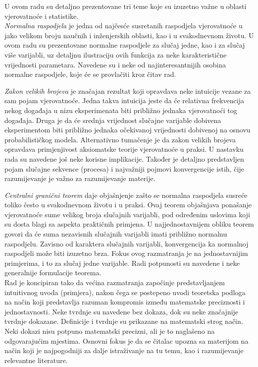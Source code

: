 
\indent
U ovom radu su detaljno prezentovane tri teme koje su izuzetno važne u oblasti
vjerovatnoće i statistike.  \\

\textit{Normalna raspodjela} je jedna od najčesće susretanih raspodjela vjerovatnoće u
jako velikom broju naučnih i inženjerskih oblasti, kao i u svakodnevnom životu.
U ovom radu su prezentovane normalne raspodjele za slučaj jedne, kao i za slučaj
više varijabli, uz detaljnu ilustraciju ovih funkcija za neke karakteristične
vrijednosti parametara. Navedene su i neke od najinteresantnijih osobina
normalne raspodjele, koje će se provlačiti kroz čitav rad.

\textit{Zakon velikih brojeva} je značajan rezultat koji opravdava neke
intuicije vezane za sam pojam vjerovatnoće. Jedna takva intuicija jeste da će
relativna frekvencija nekog događaja u nizu eksperimenata biti približno jednaka
vjerovatnoći tog događaja. Druga je da će srednja vrijednost slučajne varijable
dobivena eksperimentom biti približno jednaka očekivanoj vrijednosti dobivenoj
na osnovu probabilističkog modela. Alternativno tumačenje je da zakon velikih
brojeva opravdava primjenjivost aksiomatske teorije vjerovatnoće u praksi. U
nastavku rada su navedene još neke korisne implikacije. Također je detaljno
predstavljen pojam slučajne sekvence (procesa) i najvažniji pojmovi
konvergencije istih, čije razumijevanje je važno za razumijevanje materije. 

\textit{Centralni granični teorem} daje objašnjenje zašto se normalna raspodjela
susreće toliko često u svakodnevnom životu i u praksi. Ovaj teorem objašnjava
ponašanje vjerovatnoće sume velikog broja slučajnih varijabli, pod određenim
uslovima koji su dosta blagi sa aspekta praktičnih primjena. U najjednostavnijem
obliku teorem govori da će suma nezavisnih slučajnih varijabli imati približno
normalnu raspodjelu.  Zavisno od karaktera slučajnih varijabli, konvergencija ka
normalnoj raspodjeli može biti izuzetno brza. Fokus ovog razmatranja je na
jednostavnijim primjerima, i to za slučaj jedne varijable. Radi potpunosti su
navedene i neke generalnije formulacije teorema. \\

Rad je koncipiran tako da većina razmatranja započinje predstavljanjem
intuitivnog uvoda (primjera), nakon čega se postepeno uvodi teoretska podloga na
način koji predstavlja razuman kompromis između matematske preciznosti i
jednostavnosti.  Neke tvrdnje su navedene bez dokaza, dok su neke značajnije
tvrdnje dokazane.  Definicije i tvrdnje su prikazane na matematski strog način.
Neki dokazi nisu potpuno matematski precizni, ali je to naglašeno na
odgovarajućim mjestima.  Osnovni fokus je da se čitalac upozna sa materijom na
način koji je najpogodniji za dalje istraživanje na tu temu, kao i razumijevanje
relevantne literature. 

